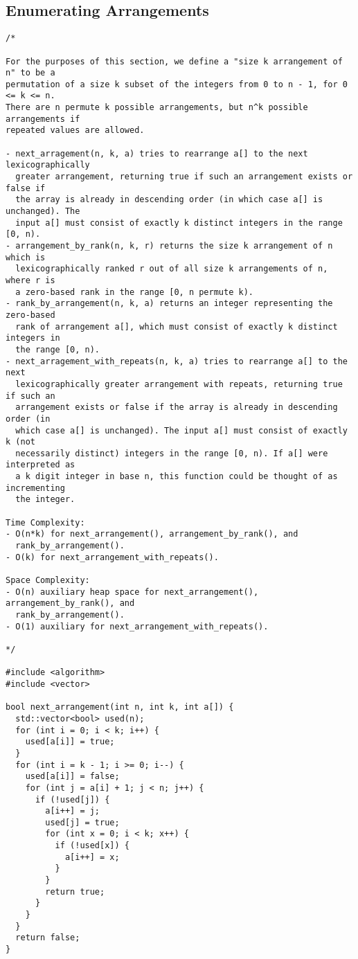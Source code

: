 \subsection{Enumerating Arrangements}
\begin{lstlisting}
/*

For the purposes of this section, we define a "size k arrangement of n" to be a
permutation of a size k subset of the integers from 0 to n - 1, for 0 <= k <= n.
There are n permute k possible arrangements, but n^k possible arrangements if
repeated values are allowed.

- next_arragement(n, k, a) tries to rearrange a[] to the next lexicographically
  greater arrangement, returning true if such an arrangement exists or false if
  the array is already in descending order (in which case a[] is unchanged). The
  input a[] must consist of exactly k distinct integers in the range [0, n).
- arrangement_by_rank(n, k, r) returns the size k arrangement of n which is
  lexicographically ranked r out of all size k arrangements of n, where r is
  a zero-based rank in the range [0, n permute k).
- rank_by_arrangement(n, k, a) returns an integer representing the zero-based
  rank of arrangement a[], which must consist of exactly k distinct integers in
  the range [0, n).
- next_arragement_with_repeats(n, k, a) tries to rearrange a[] to the next
  lexicographically greater arrangement with repeats, returning true if such an
  arrangement exists or false if the array is already in descending order (in
  which case a[] is unchanged). The input a[] must consist of exactly k (not
  necessarily distinct) integers in the range [0, n). If a[] were interpreted as
  a k digit integer in base n, this function could be thought of as incrementing
  the integer.

Time Complexity:
- O(n*k) for next_arrangement(), arrangement_by_rank(), and
  rank_by_arrangement().
- O(k) for next_arrangement_with_repeats().

Space Complexity:
- O(n) auxiliary heap space for next_arrangement(), arrangement_by_rank(), and
  rank_by_arrangement().
- O(1) auxiliary for next_arrangement_with_repeats().

*/

#include <algorithm>
#include <vector>

bool next_arrangement(int n, int k, int a[]) {
  std::vector<bool> used(n);
  for (int i = 0; i < k; i++) {
    used[a[i]] = true;
  }
  for (int i = k - 1; i >= 0; i--) {
    used[a[i]] = false;
    for (int j = a[i] + 1; j < n; j++) {
      if (!used[j]) {
        a[i++] = j;
        used[j] = true;
        for (int x = 0; i < k; x++) {
          if (!used[x]) {
            a[i++] = x;
          }
        }
        return true;
      }
    }
  }
  return false;
}


\end{lstlisting}
